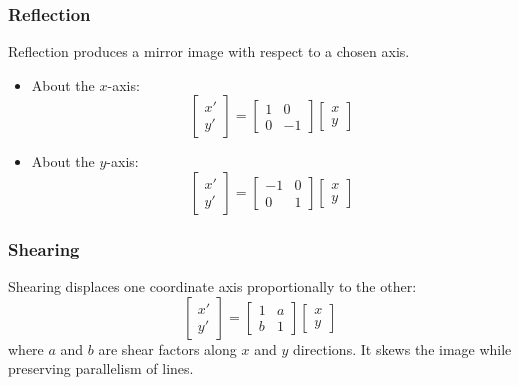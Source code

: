 \documentclass[12pt,a4paper]{AnantDocumentation}
\begin{document}
\subsubsection{Reflection}
Reflection produces a mirror image with respect to a chosen axis.
\begin{itemize}
\item About the $x$-axis:
\[
\begin{bmatrix} x' \\ y' \end{bmatrix} =
\begin{bmatrix} 1 & 0 \\ 0 & -1 \end{bmatrix}
\begin{bmatrix} x \\ y \end{bmatrix}
\]
\item About the $y$-axis:
\[
\begin{bmatrix} x' \\ y' \end{bmatrix} =
\begin{bmatrix} -1 & 0 \\ 0 & 1 \end{bmatrix}
\begin{bmatrix} x \\ y \end{bmatrix}
\]
\end{itemize}

\subsubsection{Shearing}
Shearing displaces one coordinate axis proportionally to the other:
\begin{equation}
\begin{bmatrix} x' \\ y' \end{bmatrix} =
\begin{bmatrix} 1 & a \\ b & 1 \end{bmatrix}
\begin{bmatrix} x \\ y \end{bmatrix}
\end{equation}
where $a$ and $b$ are shear factors along $x$ and $y$ directions.  
It skews the image while preserving parallelism of lines.
\end{document}
